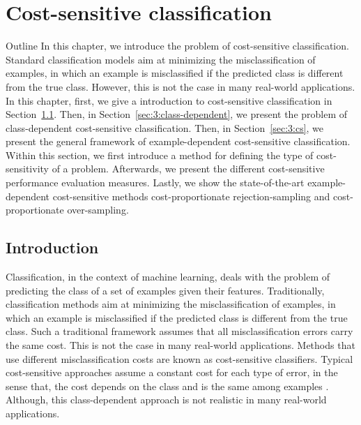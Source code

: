 \chapter{Cost-sensitive classification}\label{ch:3}

\begin{remark}{Outline}
In this chapter, we introduce the problem of cost-sensitive classification. Standard 
classification models aim at minimizing the misclassification of examples, in which an example is 
misclassified if the predicted class is different from the true class. However, this is not the 
case in many real-world applications.
In this chapter, first, we give a introduction to cost-sensitive classification in 
Section~\ref{sec:3:intro}. Then, in Section~\ref{sec:3:class-dependent}, we present the problem of 
class-dependent cost-sensitive classification. Then, in Section~\ref{sec:3:cs}, we present the 
general framework of example-dependent cost-sensitive classification. Within this section, we first 
introduce a method for defining the type of cost-sensitivity of a problem. Afterwards, we present 
the different cost-sensitive performance evaluation measures. Lastly, we show the state-of-the-art 
example-dependent cost-sensitive methods cost-proportionate rejection-sampling and 
cost-proportionate over-sampling.
\end{remark}


\section{Introduction}
\label{sec:3:intro}

  Classification, in the context of machine learning, deals with the problem of predicting the class
  of a set of examples given their features. Traditionally, classification methods aim at 
  minimizing the misclassification of examples, in which an example is misclassified if the 
  predicted class is different from the true class. Such a traditional framework assumes that all 
  misclassification errors carry the same cost. This is not the case in many real-world 
  applications. Methods that use different misclassification costs are known as cost-sensitive 
  classifiers. Typical cost-sensitive approaches assume a constant cost for each type of error, in 
  the sense that, the cost depends on the class and is the same among examples
  \citep{Elkan2001,Kim2012}. Although, this class-dependent approach is not realistic in many 
  real-world applications.
  
